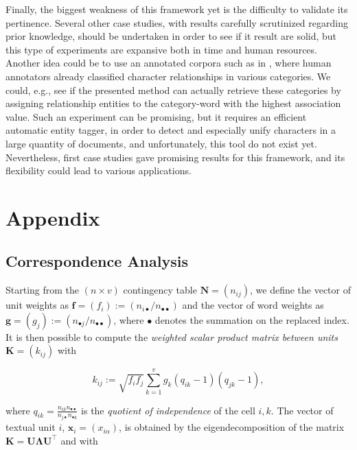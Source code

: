 \documentclass[
twocolumn,
]{ceurart}
\begin{document}
Finally, the biggest weakness of this framework yet is the difficulty to validate its pertinence. Several other case studies, with results carefully scrutinized regarding prior knowledge, should be undertaken in order to see if it result are solid, but this type of experiments are expansive both in time and human resources. Another idea could be to use an annotated corpora such as in \cite{Massey2015}, where human annotators already classified character relationships in various categories. We could, e.g., see if the presented method can actually retrieve these categories by assigning relationship entities to the category-word with the highest association value. Such an experiment can be promising, but it requires an efficient automatic entity tagger, in order to detect and especially unify characters in a large quantity of documents, and unfortunately, this tool do not exist yet. Nevertheless, first case studies gave promising results for this framework, and its flexibility could lead to various applications.

\appendix

\section{Appendix}

\subsection{Correspondence Analysis}
\label{ca_details}

Starting from the $(n \times v)$ contingency table $\mathbf{N} = (n_{ij})$, we define the vector of unit weights as $\mathbf{f} = (f_i) := (n_{i\bullet}/n_{\bullet \bullet})$ and the vector of word weights as $\mathbf{g} = (g_j) := (n_{\bullet j}/n_{\bullet \bullet})$, where $\bullet$ denotes the summation on the replaced index. It is then possible to compute the \emph{weighted scalar product matrix between units} $\mathbf{K} = (k_{ij})$ with

\begin{equation}
k_{ij} := \sqrt{f_i f_j} \sum_{k=1}^{v} g_k(q_{ik} - 1)(q_{jk} - 1), 
\end{equation}

where $q_{ik} = \frac{n_{ik} n_{\bullet \bullet}}{n_{j \bullet} n_{\bullet k}}$ is the \emph{quotient of independence} of the cell $i, k$. The vector of textual unit $i$, $\mathbf{x}_i = (x_{i\alpha})$, is obtained by the eigendecomposition of the matrix $\mathbf{K} = \mathbf{U}\bm{\Lambda}\mathbf{U}^\top$ and with
\end{document}
